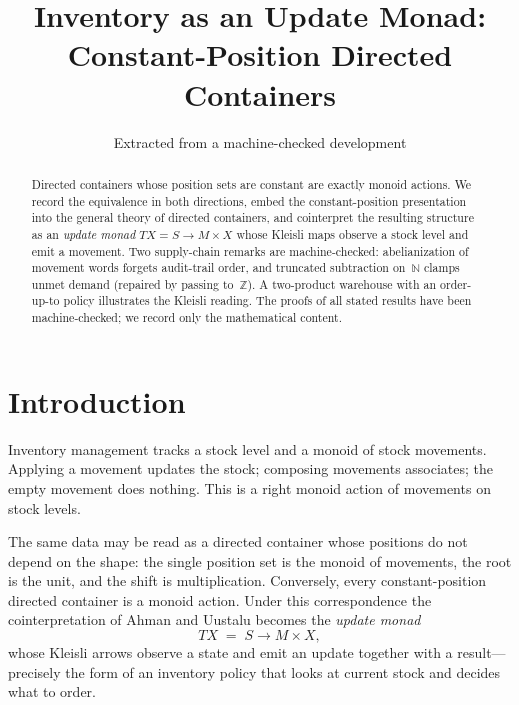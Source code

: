 \documentclass[11pt,a4paper]{article}
\title{Inventory as an Update Monad:\\
  Constant-Position Directed Containers}
\author{Extracted from a machine-checked development}
\date{}
\theoremstyle{plain}
\theoremstyle{definition}
\begin{document}
\maketitle

\begin{abstract}
Directed containers whose position sets are constant are exactly monoid
actions. We record the equivalence in both directions, embed the
constant-position presentation into the general theory of directed
containers, and cointerpret the resulting structure as an \emph{update
monad} $TX = S \to M \times X$ whose Kleisli maps observe a stock level
and emit a movement. Two supply-chain remarks are machine-checked:
abelianization of movement words forgets audit-trail order, and truncated
subtraction on~$\mathbb{N}$ clamps unmet demand (repaired by passing
to~$\mathbb{Z}$). A two-product warehouse with an order-up-to policy
illustrates the Kleisli reading. The proofs of all stated results have
been machine-checked; we record only the mathematical content.
\end{abstract}

\tableofcontents
\bigskip

\section{Introduction}

Inventory management tracks a stock level and a monoid of stock
movements. Applying a movement updates the stock; composing movements
associates; the empty movement does nothing. This is a right monoid
action of movements on stock levels.

The same data may be read as a directed container whose positions do not
depend on the shape: the single position set is the monoid of movements,
the root is the unit, and the shift is multiplication. Conversely, every
constant-position directed container is a monoid action. Under this
correspondence the cointerpretation of Ahman and Uustalu becomes the
\emph{update monad}
\[
  TX \;=\; S \longrightarrow M \times X,
\]
whose Kleisli arrows observe a state and emit an update together with a
result---precisely the form of an inventory policy that looks at current
stock and decides what to order.
\end{document}
